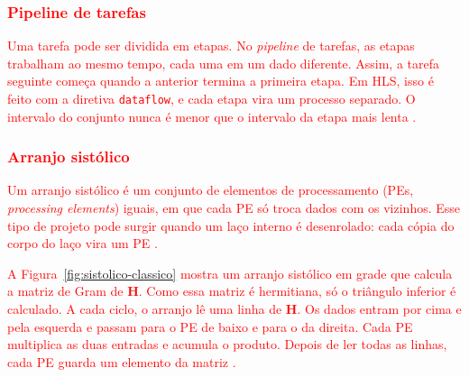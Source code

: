 \subsubsection{\textcolor{red}{Pipeline de tarefas}}\label{subsubsec:pipeline-tarefas}
\textcolor{red}{Uma tarefa pode ser dividida em etapas. No \textit{pipeline} de tarefas, as etapas trabalham ao mesmo tempo, cada uma em um dado diferente. Assim, a tarefa seguinte começa quando a anterior termina a primeira etapa. Em HLS, isso é feito com a diretiva \texttt{dataflow}, e cada etapa vira um processo separado. O intervalo do conjunto nunca é menor que o intervalo da etapa mais lenta \cite[pp.~113--115]{kastner-hls}.}

\subsubsection{\textcolor{red}{Arranjo sistólico}}\label{subsubsec:arranjo-sistolico}
\textcolor{red}{Um arranjo sistólico é um conjunto de elementos de processamento (PEs, \textit{processing elements}) iguais, em que cada PE só troca dados com os vizinhos. Esse tipo de projeto pode surgir quando um laço interno é desenrolado: cada cópia do corpo do laço vira um PE \cite[p.~180]{kastner-hls}.}

\textcolor{red}{A Figura~\ref{fig:sistolico-classico} mostra um arranjo sistólico em grade que calcula a matriz de Gram de $\mathbf H$. Como essa matriz é hermitiana, só o triângulo inferior é calculado. A cada ciclo, o arranjo lê uma linha de $\mathbf H$. Os dados entram por cima e pela esquerda e passam para o PE de baixo e para o da direita. Cada PE multiplica as duas entradas e acumula o produto. Depois de ler todas as linhas, cada PE guarda um elemento da matriz \cite[p.~2979]{wang2021tlbdinsa}.}

